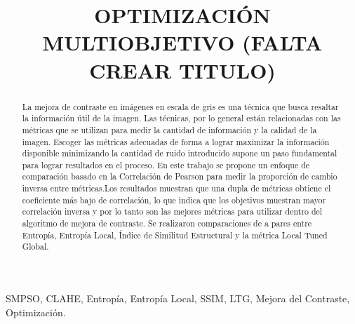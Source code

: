 \documentclass[spanish,twocolumn]{article}
\title{OPTIMIZACIÓN MULTIOBJETIVO (FALTA CREAR TITULO) }
\begin{document}
%	
\maketitle
%
\begin{abstract}


La mejora de contraste en imágenes en escala de gris es una técnica que busca resaltar la información útil de la imagen. Las técnicas, por lo general están relacionadas con las métricas que se utilizan para medir la cantidad de información y la calidad de la imagen. Escoger las métricas adecuadas de forma a lograr maximizar la información disponible minimizando la cantidad de ruido introducido supone un paso fundamental para lograr resultados en el proceso. En este trabajo se propone un enfoque de comparación basado en la Correlación de Pearson para medir la proporción de cambio inversa entre métricas.Los resultados muestran que una dupla de métricas obtiene el coeficiente más bajo de correlación, lo que indica que los objetivos muestran mayor correlación inversa y por lo tanto son las mejores métricas para utilizar dentro del algoritmo de mejora de contraste. Se realizaron comparaciones de a pares entre Entropía, Entropía Local, Índice de Similitud Estructural y la métrica Local Tuned Global.


\end{abstract}
%
\begin{keywords}
SMPSO, CLAHE, Entropía, Entropía Local, SSIM, LTG, Mejora del Contraste, Optimización.
\end{keywords}
%
\end{document}
